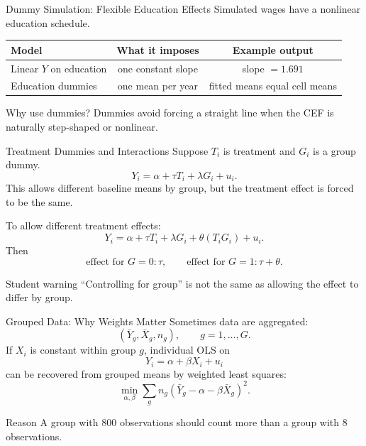 \documentclass[11pt,aspectratio=169]{beamer}
\newcommand{\derivbutton}[1]{\vspace{0.4em}\hfill\hyperlink{app:#1}{\beamerbutton{Appendix details}}}
\begin{document}
\begin{frame}{Dummy Simulation: Flexible Education Effects}
  Simulated wages have a nonlinear education schedule.
  \vspace{0.3em}

  \begin{center}
    \begin{tabular}{@{}lcc@{}}
      \toprule
      Model & What it imposes & Example output \\
      \midrule
      Linear \(Y\) on education & one constant slope & slope \(=1.691\) \\
      Education dummies & one mean per year & fitted means equal cell means \\
      \bottomrule
    \end{tabular}
  \end{center}
  \vspace{0.3em}
  \begin{block}{Why use dummies?}
    Dummies avoid forcing a straight line when the CEF is naturally step-shaped or nonlinear.
  \end{block}
\end{frame}

\begin{frame}{Treatment Dummies and Interactions}
  Suppose \(T_i\) is treatment and \(G_i\) is a group dummy.
  \[
    Y_i=\alpha+\tau T_i+\lambda G_i+u_i.
  \]
  This allows different baseline means by group, but the treatment effect is forced to be the same.
  \vspace{0.3em}

  To allow different treatment effects:
  \[
    Y_i=\alpha+\tau T_i+\lambda G_i+\theta(T_iG_i)+u_i.
  \]
  Then
  \[
    \text{effect for }G=0:\tau,\qquad
    \text{effect for }G=1:\tau+\theta.
  \]
  \begin{block}{Student warning}
    ``Controlling for group'' is not the same as allowing the effect to differ by group.
  \end{block}
\end{frame}

\begin{frame}{Grouped Data: Why Weights Matter}
  \hypertarget{main:grouped}{}
  Sometimes data are aggregated:
  \[
    (\bar Y_g,\bar X_g,n_g),\qquad g=1,\ldots,G.
  \]
  If \(X_i\) is constant within group \(g\), individual OLS on
  \[
    Y_i=\alpha+\beta X_i+u_i
  \]
  can be recovered from grouped means by weighted least squares:
  \[
    \min_{\alpha,\beta}\sum_g n_g(\bar Y_g-\alpha-\beta \bar X_g)^2.
  \]
  \begin{block}{Reason}
    A group with 800 observations should count more than a group with 8 observations.
  \end{block}
  \derivbutton{grouped}
\end{frame}
\end{document}
